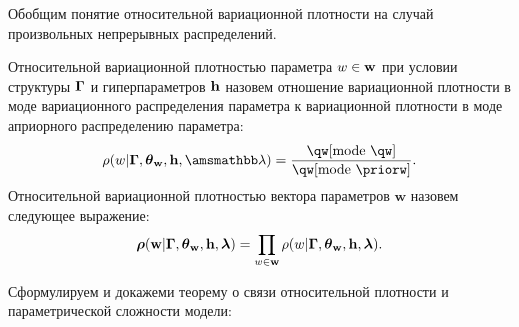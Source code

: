 Обобщим понятие относительной вариационной плотности на случай произвольных непрерывных распределений.
\begin{defin}
Относительной вариационной   плотностью параметра $w \in \mathbf{w}$  при условии структуры $\boldsymbol{\Gamma}$ и гиперпараметров $\mathbf{h}$ назовем отношение вариационной плотности в моде вариационного распределения параметра к вариационной плотности в моде априорного распределению параметра:
\[
\rho(w|\G,\tetaw, \h,\Lamb)=\frac{\qw[\text{mode}~\qw]}{\qw[\text{mode}~\priorw]}.
\]
Относительной вариационной плотностью вектора параметров $\mathbf{w}$ назовем следующее выражение:
\[
    \boldsymbol{\rho}(\mathbf{w}|\boldsymbol{\Gamma}, \boldsymbol{\theta}_\mathbf{w}, \mathbf{h},\boldsymbol{\lambda}) = \prod_{w \in \mathbf{w}}\rho(w|\boldsymbol{\Gamma},\boldsymbol{\theta}_\mathbf{w},\mathbf{h},\boldsymbol{\lambda}).
\]

\end{defin}

Сформулируем и докажеми теорему о связи относительной плотности и параметрической сложности модели:

